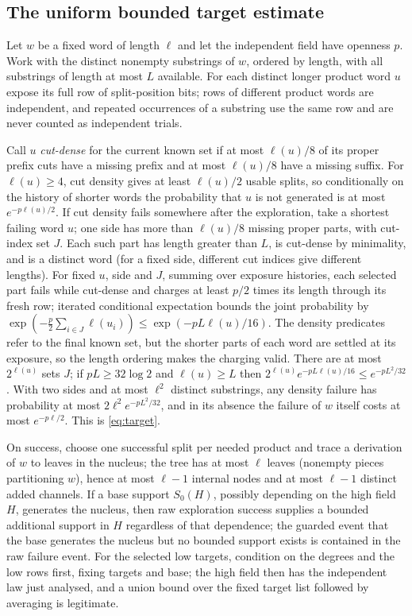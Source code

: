 \documentclass[11pt,letterpaper]{article}
\theoremstyle{plain}
\theoremstyle{definition}
\theoremstyle{remark}
\numberwithin{equation}{section}
\begin{document}
\subsection{The uniform bounded target estimate}\label{app:target}
Let $w$ be a fixed word of length $\ell$ and let the independent field have openness $p$. Work with the distinct nonempty substrings of $w$, ordered by length, with all substrings of length at most $L$ available. For each distinct longer product word $u$ expose its full row of split-position bits; rows of different product words are independent, and repeated occurrences of a substring use the same row and are never counted as independent trials.

Call $u$ \emph{cut-dense} for the current known set if at most $\ell(u)/8$ of its proper prefix cuts have a missing prefix and at most $\ell(u)/8$ have a missing suffix. For $\ell(u)\ge4$, cut density gives at least $\ell(u)/2$ usable splits, so conditionally on the history of shorter words the probability that $u$ is not generated is at most $e^{-p\ell(u)/2}$. If cut density fails somewhere after the exploration, take a shortest failing word $u$; one side has more than $\ell(u)/8$ missing proper parts, with cut-index set $J$. Each such part has length greater than $L$, is cut-dense by minimality, and is a distinct word (for a fixed side, different cut indices give different lengths). For fixed $u$, side and $J$, summing over exposure histories, each selected part fails while cut-dense and charges at least $p/2$ times its length through its fresh row; iterated conditional expectation bounds the joint probability by $\exp(-\frac p2\sum_{i\in J}\ell(u_i))\le\exp(-pL\ell(u)/16)$. The density predicates refer to the final known set, but the shorter parts of each word are settled at its exposure, so the length ordering makes the charging valid. There are at most $2^{\ell(u)}$ sets $J$; if $pL\ge32\log2$ and $\ell(u)\ge L$ then $2^{\ell(u)}e^{-pL\ell(u)/16}\le e^{-pL^2/32}$. With two sides and at most $\ell^2$ distinct substrings, any density failure has probability at most $2\ell^2e^{-pL^2/32}$, and in its absence the failure of $w$ itself costs at most $e^{-p\ell/2}$. This is \eqref{eq:target}.

On success, choose one successful split per needed product and trace a derivation of $w$ to leaves in the nucleus; the tree has at most $\ell$ leaves (nonempty pieces partitioning $w$), hence at most $\ell-1$ internal nodes and at most $\ell-1$ distinct added channels. If a base support $S_0(H)$, possibly depending on the high field $H$, generates the nucleus, then raw exploration success supplies a bounded additional support in $H$ regardless of that dependence; the guarded event that the base generates the nucleus but no bounded support exists is contained in the raw failure event. For the selected low targets, condition on the degrees and the low rows first, fixing targets and base; the high field then has the independent law just analysed, and a union bound over the fixed target list followed by averaging is legitimate.
\end{document}
